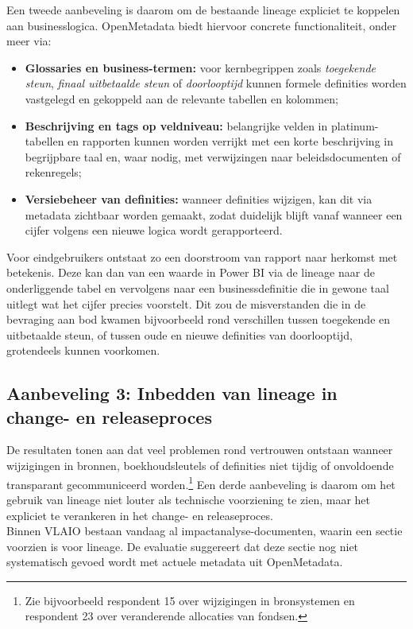 Een tweede aanbeveling is daarom om de bestaande lineage expliciet te koppelen aan businesslogica. OpenMetadata biedt hiervoor concrete functionaliteit, onder meer via:
\begin{itemize}
	\item \textbf{Glossaries en business-termen:} voor kernbegrippen zoals \emph{toegekende steun}, \emph{finaal uitbetaalde steun} of \emph{doorlooptijd} kunnen formele definities worden vastgelegd en gekoppeld aan de relevante tabellen en kolommen;
	\item \textbf{Beschrijving en tags op veldniveau:} belangrijke velden in platinum-tabellen en rapporten kunnen worden verrijkt met een korte beschrijving in begrijpbare taal en, waar nodig, met verwijzingen naar beleidsdocumenten of rekenregels;
	\item \textbf{Versiebeheer van definities:} wanneer definities wijzigen, kan dit via metadata zichtbaar worden gemaakt, zodat duidelijk blijft vanaf wanneer een cijfer volgens een nieuwe logica wordt gerapporteerd.
\end{itemize}

Voor eindgebruikers ontstaat zo een doorstroom van rapport naar herkomst met betekenis. Deze kan dan van een waarde in Power BI via de lineage naar de onderliggende tabel en vervolgens naar een businessdefinitie die in gewone taal uitlegt wat het cijfer precies voorstelt. Dit zou de misverstanden die in de bevraging aan bod kwamen bijvoorbeeld rond verschillen tussen toegekende en uitbetaalde steun, of tussen oude en nieuwe definities van doorlooptijd, grotendeels kunnen voorkomen.\\

\subsection*{Aanbeveling 3: Inbedden van lineage in change- en releaseproces}

De resultaten tonen aan dat veel problemen rond vertrouwen ontstaan wanneer wijzigingen in bronnen, boekhoudsleutels of definities niet tijdig of onvoldoende transparant gecommuniceerd worden.\footnote{Zie bijvoorbeeld respondent 15 over wijzigingen in bronsystemen en respondent 23 over veranderende allocaties van fondsen.} Een derde aanbeveling is daarom om het gebruik van lineage niet louter als technische voorziening te zien, maar het expliciet te verankeren in het change- en releaseproces.\\

Binnen VLAIO bestaan vandaag al impactanalyse-documenten, waarin een sectie voorzien is voor lineage. De evaluatie suggereert dat deze sectie nog niet systematisch gevoed wordt met actuele metadata uit OpenMetadata.

